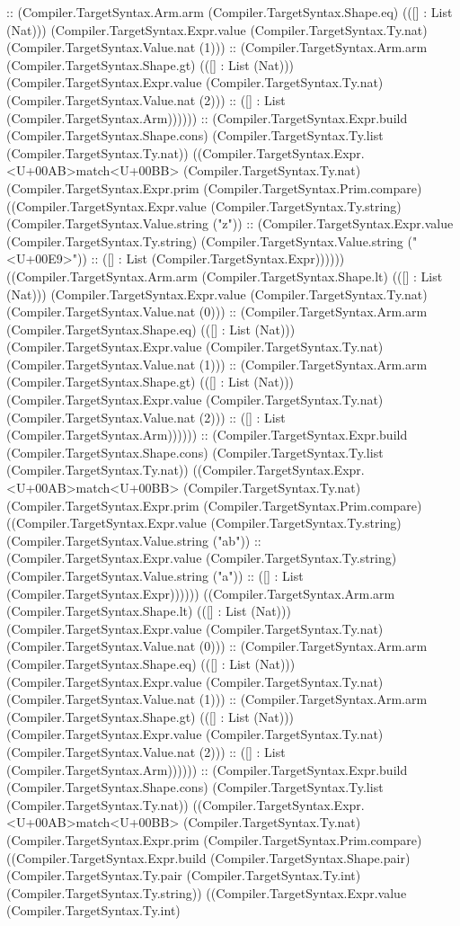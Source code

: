 \documentclass[11pt]{article}
\begin{document}
:: (Compiler.TargetSyntax.Arm.arm (Compiler.TargetSyntax.Shape.eq) (([] : List (Nat))) (Compiler.TargetSyntax.Expr.value (Compiler.TargetSyntax.Ty.nat) (Compiler.TargetSyntax.Value.nat (1))) :: (Compiler.TargetSyntax.Arm.arm (Compiler.TargetSyntax.Shape.gt) (([] : List (Nat))) (Compiler.TargetSyntax.Expr.value (Compiler.TargetSyntax.Ty.nat) (Compiler.TargetSyntax.Value.nat (2))) :: ([] : List (Compiler.TargetSyntax.Arm)))))) :: (Compiler.TargetSyntax.Expr.build (Compiler.TargetSyntax.Shape.cons) (Compiler.TargetSyntax.Ty.list (Compiler.TargetSyntax.Ty.nat)) ((Compiler.TargetSyntax.Expr.<U+00AB>match<U+00BB> (Compiler.TargetSyntax.Ty.nat) (Compiler.TargetSyntax.Expr.prim (Compiler.TargetSyntax.Prim.compare) ((Compiler.TargetSyntax.Expr.value (Compiler.TargetSyntax.Ty.string) (Compiler.TargetSyntax.Value.string ("z")) :: (Compiler.TargetSyntax.Expr.value (Compiler.TargetSyntax.Ty.string) (Compiler.TargetSyntax.Value.string ("<U+00E9>")) :: ([] : List (Compiler.TargetSyntax.Expr)))))) ((Compiler.TargetSyntax.Arm.arm (Compiler.TargetSyntax.Shape.lt) (([] : List (Nat))) (Compiler.TargetSyntax.Expr.value (Compiler.TargetSyntax.Ty.nat) (Compiler.TargetSyntax.Value.nat (0))) :: (Compiler.TargetSyntax.Arm.arm (Compiler.TargetSyntax.Shape.eq) (([] : List (Nat))) (Compiler.TargetSyntax.Expr.value (Compiler.TargetSyntax.Ty.nat) (Compiler.TargetSyntax.Value.nat (1))) :: (Compiler.TargetSyntax.Arm.arm (Compiler.TargetSyntax.Shape.gt) (([] : List (Nat))) (Compiler.TargetSyntax.Expr.value (Compiler.TargetSyntax.Ty.nat) (Compiler.TargetSyntax.Value.nat (2))) :: ([] : List (Compiler.TargetSyntax.Arm)))))) :: (Compiler.TargetSyntax.Expr.build (Compiler.TargetSyntax.Shape.cons) (Compiler.TargetSyntax.Ty.list (Compiler.TargetSyntax.Ty.nat)) ((Compiler.TargetSyntax.Expr.<U+00AB>match<U+00BB> (Compiler.TargetSyntax.Ty.nat) (Compiler.TargetSyntax.Expr.prim (Compiler.TargetSyntax.Prim.compare) ((Compiler.TargetSyntax.Expr.value (Compiler.TargetSyntax.Ty.string) (Compiler.TargetSyntax.Value.string ("ab")) :: (Compiler.TargetSyntax.Expr.value (Compiler.TargetSyntax.Ty.string) (Compiler.TargetSyntax.Value.string ("a")) :: ([] : List (Compiler.TargetSyntax.Expr)))))) ((Compiler.TargetSyntax.Arm.arm (Compiler.TargetSyntax.Shape.lt) (([] : List (Nat))) (Compiler.TargetSyntax.Expr.value (Compiler.TargetSyntax.Ty.nat) (Compiler.TargetSyntax.Value.nat (0))) :: (Compiler.TargetSyntax.Arm.arm (Compiler.TargetSyntax.Shape.eq) (([] : List (Nat))) (Compiler.TargetSyntax.Expr.value (Compiler.TargetSyntax.Ty.nat) (Compiler.TargetSyntax.Value.nat (1))) :: (Compiler.TargetSyntax.Arm.arm (Compiler.TargetSyntax.Shape.gt) (([] : List (Nat))) (Compiler.TargetSyntax.Expr.value (Compiler.TargetSyntax.Ty.nat) (Compiler.TargetSyntax.Value.nat (2))) :: ([] : List (Compiler.TargetSyntax.Arm)))))) :: (Compiler.TargetSyntax.Expr.build (Compiler.TargetSyntax.Shape.cons) (Compiler.TargetSyntax.Ty.list (Compiler.TargetSyntax.Ty.nat)) ((Compiler.TargetSyntax.Expr.<U+00AB>match<U+00BB> (Compiler.TargetSyntax.Ty.nat) (Compiler.TargetSyntax.Expr.prim (Compiler.TargetSyntax.Prim.compare) ((Compiler.TargetSyntax.Expr.build (Compiler.TargetSyntax.Shape.pair) (Compiler.TargetSyntax.Ty.pair (Compiler.TargetSyntax.Ty.int) (Compiler.TargetSyntax.Ty.string)) ((Compiler.TargetSyntax.Expr.value (Compiler.TargetSyntax.Ty.int) 
\end{document}
